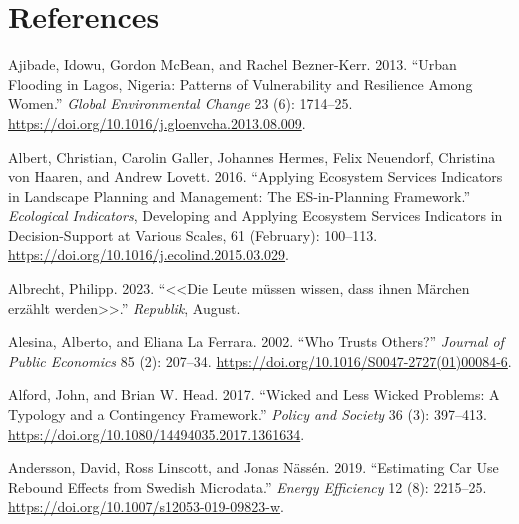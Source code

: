 \documentclass[
  a4paper,
  openany]{book}
\newlength{\cslhangindent}
\newenvironment{CSLReferences}[2] %
 {\begin{list}{}{%
  \setlength{\itemindent}{0pt}
  \setlength{\leftmargin}{0pt}
  \setlength{\parsep}{0pt}
  \ifodd #1
   \setlength{\leftmargin}{\cslhangindent}
   \setlength{\itemindent}{-1\cslhangindent}
  \fi
  \setlength{\itemsep}{#2\baselineskip}}}
 {\end{list}}
\begin{document}

\chapter*{References}\label{references}


\label{refs}
\begin{CSLReferences}{1}{0}
Ajibade, Idowu, Gordon McBean, and Rachel Bezner-Kerr. 2013. {``Urban
Flooding in {Lagos}, {Nigeria}: {Patterns} of Vulnerability and
Resilience Among Women.''} \emph{Global Environmental Change} 23 (6):
1714--25. \url{https://doi.org/10.1016/j.gloenvcha.2013.08.009}.

Albert, Christian, Carolin Galler, Johannes Hermes, Felix Neuendorf,
Christina von Haaren, and Andrew Lovett. 2016. {``Applying Ecosystem
Services Indicators in Landscape Planning and Management: {The
ES-in-Planning} Framework.''} \emph{Ecological Indicators}, Developing
and {Applying Ecosystem Services Indicators} in {Decision-Support} at
{Various Scales}, 61 (February): 100--113.
\url{https://doi.org/10.1016/j.ecolind.2015.03.029}.

Albrecht, Philipp. 2023. {``{\textless\textless Die Leute m{ü}ssen
wissen, dass ihnen M{ä}rchen erz{ä}hlt
werden\textgreater\textgreater{}}.''} \emph{Republik}, August.

Alesina, Alberto, and Eliana La Ferrara. 2002. {``Who Trusts Others?''}
\emph{Journal of Public Economics} 85 (2): 207--34.
\url{https://doi.org/10.1016/S0047-2727(01)00084-6}.

Alford, John, and Brian W. Head. 2017. {``Wicked and Less Wicked
Problems: A Typology and a Contingency Framework.''} \emph{Policy and
Society} 36 (3): 397--413.
\url{https://doi.org/10.1080/14494035.2017.1361634}.

Andersson, David, Ross Linscott, and Jonas Nässén. 2019. {``Estimating
Car Use Rebound Effects from {Swedish} Microdata.''} \emph{Energy
Efficiency} 12 (8): 2215--25.
\url{https://doi.org/10.1007/s12053-019-09823-w}.


\end{CSLReferences}
\end{document}
